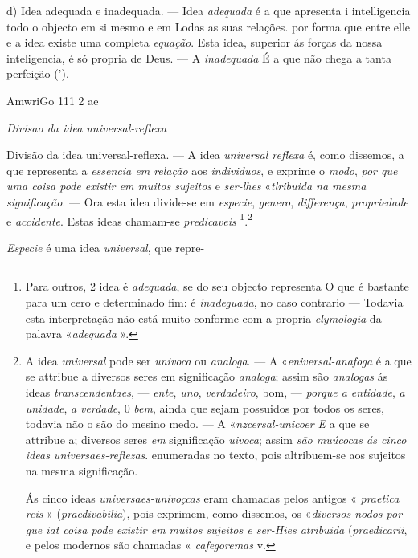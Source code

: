 d) Idea adequada e inadequada. --- Idea \emph{adequada} é a que apresenta i intelligencia todo o objecto em si mesmo e em Lodas as suas relações. por forma que entre elle e a idea existe uma completa \emph{equação}. Esta idea, superior ás forças da nossa inteligencia, é só propria de Deus. --- A \emph{inadequada} É a que não chega a tanta perfeição (').

AmwriGo 111 2 \textbar{} ae

\emph{Divisao da idea universal-reflexa}

Divisão da idea universal-reflexa. --- A idea \emph{universal reflexa} é, como dissemos, a que representa a \emph{essencia em relação} aos \emph{individuos}, e exprime o \emph{modo}, \emph{por que uma coisa pode existir em muitos sujeitos} e \emph{ser-lhes} «\emph{tlribuida na mesma significação}. --- Ora esta idea divide-se em \emph{especie}, \emph{genero}, \emph{differença}, \emph{propriedade} e \emph{accidente}. Estas ideas chamam-se \emph{predicaveis} \footnote{Para outros, 2 idea é \emph{adequada}, se do seu objecto representa O que é bastante para um cero e determinado fim: é \emph{inadeguada}, no caso contrario --- Todavia esta interpretação não está muito conforme com a propria \emph{elymologia} da palavra «\emph{adequada} ».}.\footnote{A idea \emph{universal} pode ser \emph{univoca} ou \emph{analoga}. --- A «\emph{eniversal-anafoga} é a que se attribue a diversos seres em significação \emph{analoga}; assim são \emph{analogas} ás ideas \emph{transcendentaes}, --- \emph{ente}, \emph{uno}, \emph{verdadeiro}, bom, --- \emph{porque a entidade}, \emph{a unidade}, \emph{a verdade}, 0 \emph{bem}, ainda que sejam possuidos por todos os seres, todavia não o são do mesino medo. --- A «\emph{nzcersal-unicoer E} a que se attribue a; diversos seres \emph{em} significação \emph{uivoca}; assim \emph{são muúcocas ás cinco ideas universaes-reflezas}. enumeradas no texto, pois altribuem-se aos sujeitos na mesma significação.\par Ás cinco ideas \emph{universaes-univoçcas} eram chamadas pelos antigos « \emph{praetica reis} » (\emph{praedivabilia}), pois exprimem, como dissemos, os «\emph{diversos nodos por gue iat coisa pode existir em muitos sujeitos e ser-Hies atribuida} (\emph{praedicarii}, e pelos modernos são chamadas « \emph{cafegoremas} v.}


  
\emph{Especie} é uma idea \emph{universal}, que repre-

